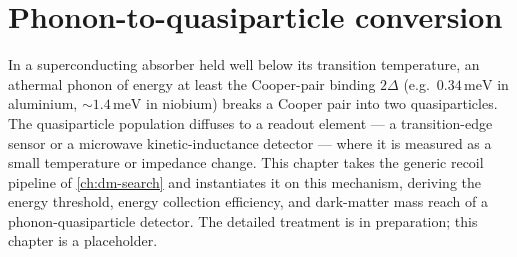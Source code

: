 \chapter{Phonon-to-quasiparticle conversion}
\label{ch:phonon-qp}

In a superconducting absorber held well below its transition
temperature, an athermal phonon of energy at least the
Cooper-pair binding $2\Delta$ (e.g.\ $0.34\,\text{meV}$ in
aluminium, $\sim 1.4\,\text{meV}$ in niobium) breaks a Cooper pair
into two quasiparticles. The quasiparticle population diffuses to a
readout element --- a transition-edge sensor or a microwave
kinetic-inductance detector --- where it is measured as a
small temperature or impedance change. This chapter takes the
generic recoil pipeline of \cref{ch:dm-search} and instantiates it
on this mechanism, deriving the energy threshold, energy
collection efficiency, and dark-matter mass reach of a
phonon-quasiparticle detector. The detailed treatment is in
preparation; this chapter is a placeholder.
